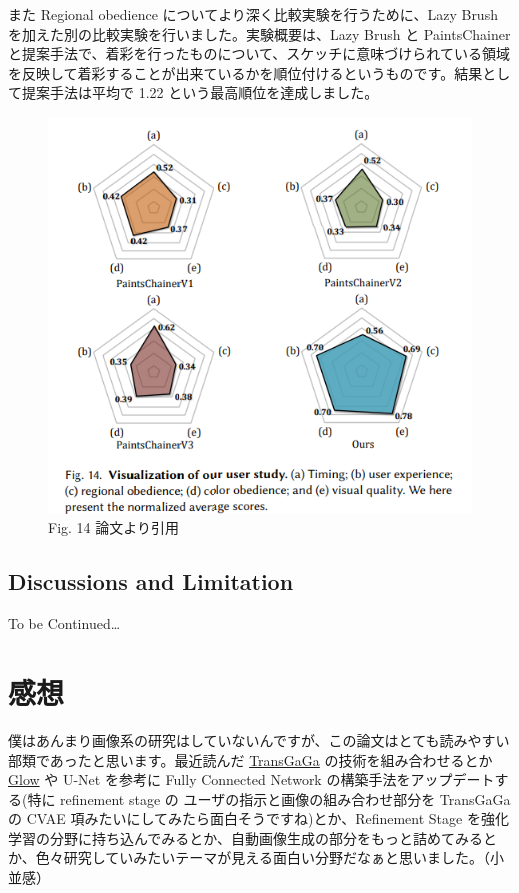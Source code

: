 \documentclass[a4paper, dvipdfmx, 10pt]{article}
\begin{document}
また Regional obedience についてより深く比較実験を行うために、Lazy Brush を加えた別の比較実験を行いました。実験概要は、Lazy Brush と PaintsChainer と提案手法で、着彩を行ったものについて、スケッチに意味づけられている領域を反映して着彩することが出来ているかを順位付けるというものです。結果として提案手法は平均で 1.22 という最高順位を達成しました。\\

\begin{figure}[htbp]
\centering
\includegraphics[width=.9\linewidth]{./img/s2p_fig14.PNG}
\caption{Fig. 14 論文より引用}
\end{figure}

\subsection{Discussions and Limitation}
\label{sec:org49d1ee3}
To be Continued\ldots{}\\

\section{感想}
\label{sec:org5efd5f8}
僕はあんまり画像系の研究はしていないんですが、この論文はとても読みやすい部類であったと思います。最近読んだ \href{https://arxiv.org/abs/1904.09571}{TransGaGa} の技術を組み合わせるとか \href{https://arxiv.org/abs/1807.03039}{Glow} や U-Net を参考に Fully Connected Network の構築手法をアップデートする(特に refinement stage の ユーザの指示と画像の組み合わせ部分を TransGaGa の CVAE 項みたいにしてみたら面白そうですね)とか、Refinement Stage を強化学習の分野に持ち込んでみるとか、自動画像生成の部分をもっと詰めてみるとか、色々研究していみたいテーマが見える面白い分野だなぁと思いました。（小並感）\\
\end{document}
